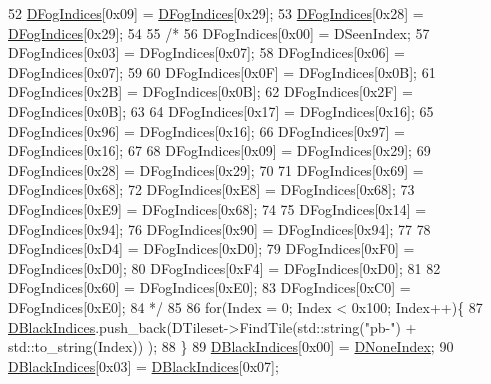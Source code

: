 \begin{DoxyCode}
52     \hyperlink{classCFogRenderer_a2028e4642e756016819aab6567800af5}{DFogIndices}[0x09] = \hyperlink{classCFogRenderer_a2028e4642e756016819aab6567800af5}{DFogIndices}[0x29];
53     \hyperlink{classCFogRenderer_a2028e4642e756016819aab6567800af5}{DFogIndices}[0x28] = \hyperlink{classCFogRenderer_a2028e4642e756016819aab6567800af5}{DFogIndices}[0x29];
54 
55     \textcolor{comment}{/*}
56 \textcolor{comment}{    DFogIndices[0x00] = DSeenIndex;}
57 \textcolor{comment}{    DFogIndices[0x03] = DFogIndices[0x07];}
58 \textcolor{comment}{    DFogIndices[0x06] = DFogIndices[0x07];}
59 \textcolor{comment}{    }
60 \textcolor{comment}{    DFogIndices[0x0F] = DFogIndices[0x0B];}
61 \textcolor{comment}{    DFogIndices[0x2B] = DFogIndices[0x0B];}
62 \textcolor{comment}{    DFogIndices[0x2F] = DFogIndices[0x0B];}
63 \textcolor{comment}{    }
64 \textcolor{comment}{    DFogIndices[0x17] = DFogIndices[0x16];}
65 \textcolor{comment}{    DFogIndices[0x96] = DFogIndices[0x16];}
66 \textcolor{comment}{    DFogIndices[0x97] = DFogIndices[0x16];}
67 \textcolor{comment}{    }
68 \textcolor{comment}{    DFogIndices[0x09] = DFogIndices[0x29];}
69 \textcolor{comment}{    DFogIndices[0x28] = DFogIndices[0x29];}
70 \textcolor{comment}{    }
71 \textcolor{comment}{    DFogIndices[0x69] = DFogIndices[0x68];}
72 \textcolor{comment}{    DFogIndices[0xE8] = DFogIndices[0x68];}
73 \textcolor{comment}{    DFogIndices[0xE9] = DFogIndices[0x68];}
74 \textcolor{comment}{    }
75 \textcolor{comment}{    DFogIndices[0x14] = DFogIndices[0x94];}
76 \textcolor{comment}{    DFogIndices[0x90] = DFogIndices[0x94];}
77 \textcolor{comment}{    }
78 \textcolor{comment}{    DFogIndices[0xD4] = DFogIndices[0xD0];}
79 \textcolor{comment}{    DFogIndices[0xF0] = DFogIndices[0xD0];}
80 \textcolor{comment}{    DFogIndices[0xF4] = DFogIndices[0xD0];}
81 \textcolor{comment}{    }
82 \textcolor{comment}{    DFogIndices[0x60] = DFogIndices[0xE0];}
83 \textcolor{comment}{    DFogIndices[0xC0] = DFogIndices[0xE0];}
84 \textcolor{comment}{    */}
85     
86     \textcolor{keywordflow}{for}(Index = 0; Index < 0x100; Index++)\{
87         \hyperlink{classCFogRenderer_a09e3b546abbe52cc9addd1edfcc5ea9c}{DBlackIndices}.push\_back(DTileset->FindTile(std::string(\textcolor{stringliteral}{"pb-"}) + std::to\_string(Index))
      );
88     \}
89     \hyperlink{classCFogRenderer_a09e3b546abbe52cc9addd1edfcc5ea9c}{DBlackIndices}[0x00] = \hyperlink{classCFogRenderer_ac4731c0fcb7e73be9fd6839659e519ba}{DNoneIndex};
90     \hyperlink{classCFogRenderer_a09e3b546abbe52cc9addd1edfcc5ea9c}{DBlackIndices}[0x03] = \hyperlink{classCFogRenderer_a09e3b546abbe52cc9addd1edfcc5ea9c}{DBlackIndices}[0x07];

\end{DoxyCode}
